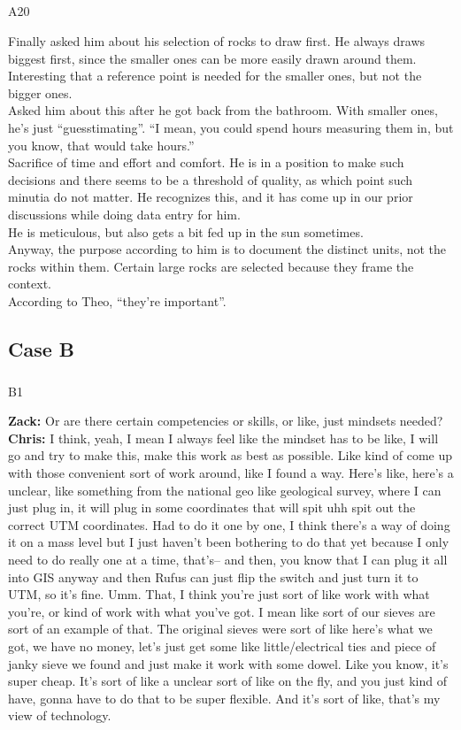 \documentclass[
]{article}
\makeatletter
\let\oldsubparagraph\subparagraph
\renewcommand{\subparagraph}{
    \@ifstar
      \xxxSubParagraphStar
      \xxxSubParagraphNoStar
  }
\newcommand{\xxxSubParagraphStar}[1]{\oldsubparagraph*{#1}\mbox{}}
\newcommand{\xxxSubParagraphNoStar}[1]{\oldsubparagraph{#1}\mbox{}}
\makeatother
\begin{document}
\subparagraph{A20}\label{sec-A20}

Finally asked him about his selection of rocks to draw first. He always
draws biggest first, since the smaller ones can be more easily drawn
around them.\\
Interesting that a reference point is needed for the smaller ones, but
not the bigger ones.\\
Asked him about this after he got back from the bathroom. With smaller
ones, he's just ``guesstimating''. ``I mean, you could spend hours
measuring them in, but you know, that would take hours.''\\
Sacrifice of time and effort and comfort. He is in a position to make
such decisions and there seems to be a threshold of quality, as which
point such minutia do not matter. He recognizes this, and it has come up
in our prior discussions while doing data entry for him.\\
He is meticulous, but also gets a bit fed up in the sun sometimes.\\
Anyway, the purpose according to him is to document the distinct units,
not the rocks within them. Certain large rocks are selected because they
frame the context.\\
According to Theo, ``they're important''.

\subsection{Case B}\label{case-b}

\subparagraph{B1}\label{sec-B1}

\textbf{Zack:} Or are there certain competencies or skills, or like,
just mindsets needed?\\
\textbf{Chris:} I think, yeah, I mean I always feel like the mindset has
to be like, I will go and try to make this, make this work as best as
possible. Like kind of come up with those convenient sort of work
around, like I found a way. Here's like, here's a unclear, like
something from the national geo like geological survey, where I can just
plug in, it will plug in some coordinates that will spit uhh spit out
the correct UTM coordinates. Had to do it one by one, I think there's a
way of doing it on a mass level but I just haven't been bothering to do
that yet because I only need to do really one at a time, that's-- and
then, you know that I can plug it all into GIS anyway and then Rufus can
just flip the switch and just turn it to UTM, so it's fine. Umm. That, I
think you're just sort of like work with what you're, or kind of work
with what you've got. I mean like sort of our sieves are sort of an
example of that. The original sieves were sort of like here's what we
got, we have no money, let's just get some like little/electrical ties
and piece of janky sieve we found and just make it work with some dowel.
Like you know, it's super cheap. It's sort of like a unclear sort of
like on the fly, and you just kind of have, gonna have to do that to be
super flexible. And it's sort of like, that's my view of technology.
\end{document}
